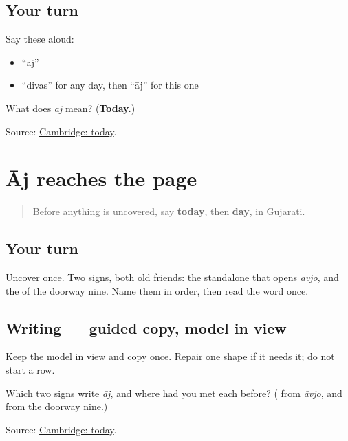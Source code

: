 \subsection*{Your turn}
Say these aloud:

\begin{itemize}
\raggedright
  \item \textquotedblleft{}āj\textquotedblright{}
  \item \textquotedblleft{}divas\textquotedblright{} for any day, then \textquotedblleft{}āj\textquotedblright{} for this one
\end{itemize}

\begin{tcolorbox}[breakable,colback=teal!4,colframe=teal!35!black,title={Before you move on}]
What does \emph{āj} mean? (\textbf{Today.})

Source: \href{https://dictionary.cambridge.org/dictionary/english-gujarati/today}{Cambridge: today}.
\end{tcolorbox}
\section[Practice]{Āj reaches the page}

\label{lesson:GU-C24-aaj}



\begin{quote}
Before anything is uncovered, say \textbf{today}, then \textbf{day}, in Gujarati.
\end{quote}

\subsection*{Your turn}
Uncover \textbf{} once. Two signs, both old friends: the standalone \textbf{} that opens \emph{āvjo}, and the \textbf{} of the doorway nine. Name them in order, then read the word once.

\subsection*{Writing — guided copy, model in view}
Keep the model in view and copy \textbf{} once. Repair one shape if it needs it; do not start a row.

\begin{tcolorbox}[breakable,colback=teal!4,colframe=teal!35!black,title={Before you move on}]
Which two signs write \emph{āj}, and where had you met each before? (\textbf{} from \emph{āvjo}, and \textbf{} from the doorway nine.)

Source: \href{https://dictionary.cambridge.org/dictionary/english-gujarati/today}{Cambridge: today}.
\end{tcolorbox}
